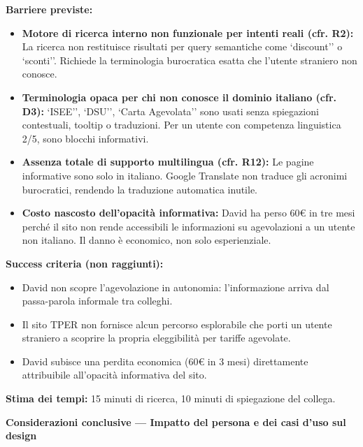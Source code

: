 \documentclass[11pt,a4paper]{article}
\begin{document}
\begin{tcolorbox}[colback=backgroundColor,colframe=borderColor,arc=2mm]
{    \textbf{Barriere previste:}
    \begin{itemize}
        \item \textbf{Motore di ricerca interno non funzionale per intenti reali (cfr. R2):} La ricerca non restituisce risultati per query semantiche come `discount'' o `sconti''. Richiede la terminologia burocratica esatta che l'utente straniero non conosce.
        \item \textbf{Terminologia opaca per chi non conosce il dominio italiano (cfr. D3):} `ISEE'', `DSU'', `Carta Agevolata'' sono usati senza spiegazioni contestuali, tooltip o traduzioni. Per un utente con competenza linguistica 2/5, sono blocchi informativi.
        \item \textbf{Assenza totale di supporto multilingua (cfr. R12):} Le pagine informative sono solo in italiano. Google Translate non traduce gli acronimi burocratici, rendendo la traduzione automatica inutile.
        \item \textbf{Costo nascosto dell'opacità informativa:} David ha perso 60\euro{} in tre mesi perché il sito non rende accessibili le informazioni su agevolazioni a un utente non italiano. Il danno è economico, non solo esperienziale.
    \end{itemize}

    \textbf{Success criteria (non raggiunti):}
    \begin{itemize}
        \item David non scopre l'agevolazione in autonomia: l'informazione arriva dal passa-parola informale tra colleghi.
        \item Il sito TPER non fornisce alcun percorso esplorabile che porti un utente straniero a scoprire la propria eleggibilità per tariffe agevolate.
        \item David subisce una perdita economica (60\euro{} in 3 mesi) direttamente attribuibile all'opacità informativa del sito.
    \end{itemize}

    \textbf{Stima dei tempi:} 15 minuti di ricerca, 10 minuti di spiegazione del collega.
    }
\end{tcolorbox}
\newpage

% 

\begin{tcolorbox}[colback=primaryColor!10,colframe=primaryColor,arc=2mm]
    \textbf{Considerazioni conclusive --- Impatto del persona e dei casi d'uso sul design}
\end{tcolorbox}
\end{document}

